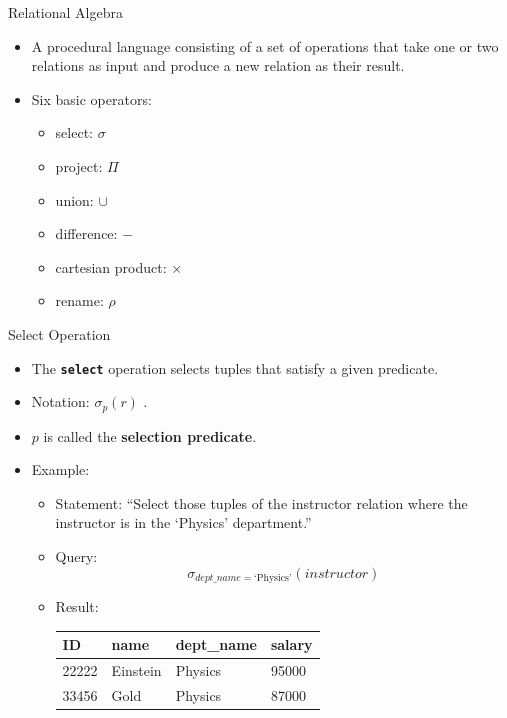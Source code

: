 \documentclass{beamer}
\begin{document}
\begin{frame}{Relational Algebra}
    \begin{itemize}
        \item A procedural language consisting of a set of operations that take one or two relations as input and produce a new relation as their result.
        \item Six basic operators:
        \begin{itemize}
            \item select: $\sigma$
            \item project: $\Pi$
            \item union: $\cup$
            \item difference: $-$
            \item cartesian product: $\times$
            \item rename: $\rho$
        \end{itemize}
    \end{itemize}
\end{frame}

\begin{frame}{Select Operation}
    \begin{itemize}
        \item The \textbf{\texttt{select}} operation selects tuples that satisfy a given predicate.
        \item Notation: { \LARGE $\sigma_p (r)$ }.
        \item $p$ is called the \textbf{selection predicate}.
        \item Example: 
        \begin{itemize}
            \item Statement: ``Select those tuples of the instructor relation where the instructor is in the `Physics' department.''
            \item Query: 
                {\large
                $$
                    \sigma_{dept\_name = \text{`Physics'}} (instructor)
                $$}
            \item Result:\\
                \vspace{2mm}
                \centering
                \begin{tabular}{| l | l | l | l |}
                \hline
                 ID & name & dept\_name & salary \\
                 \hline
                 22222 & Einstein & Physics & 95000 \\
                 \hline
                 33456 & Gold & Physics & 87000 \\
                 \hline
                \end{tabular}
        \end{itemize}
    \end{itemize}
\end{frame}
\end{document}
